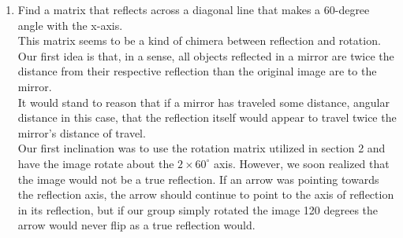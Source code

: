 \documentclass{ximera}
\begin{document}
\begin{enumerate}
After noting the location changes, they noted the position that the unit vector changed to after rotating some phi in column vector form. Rotation can sometimes be better understood as the whole of the axis rotating about the origin than the image from a Kaleidoscope rotating about a static axis.\\

According to the project objective for this section the given angle of rotation is 60 degrees. That would mean that:

$$A =  \left[\begin{array}{cc}
\cos(60) & -\sin(60) \\ \sin(60) & \cos(60) \end{array}\right] = \left[\begin{array}{cc}
\frac{1}{2} & -\frac{\sqrt{3}}{2} \\\frac{\sqrt{3}}{2}  & \frac{1}{2}\end{array}\right]$$

These values can be observed and recorded from the unit circle. \\

This is the matrix that can be used to rotate a matrix by 60 degrees:
$$A = \left[\begin{array}{cc}
\frac{1}{2} & -\frac{\sqrt{3}}{2} \\\frac{\sqrt{3}}{2}  & \frac{1}{2}\end{array}\right]$$

\item Find a matrix that reflects across a diagonal line that makes a 60-degree angle with the x-axis.\\

This matrix seems to be a kind of chimera between reflection and rotation. Our first idea is that, in a sense, all objects reflected in a mirror are twice the distance from their respective reflection than the original image are to the mirror. \\

It would stand to reason that if a mirror has traveled some distance, angular distance in this case, that the reflection itself would appear to travel twice the mirror's distance of travel.\\

Our first inclination was to use the rotation matrix utilized in section 2 and have the image rotate about the $2\times 60^\circ$ axis. However, we soon realized that the image would not be a true reflection. If an arrow was pointing towards the reflection axis, the arrow should continue to point to the axis of reflection in its reflection, but if our group simply rotated the image 120 degrees the arrow would never flip as a true reflection would.\\


\end{enumerate}
\end{document}
